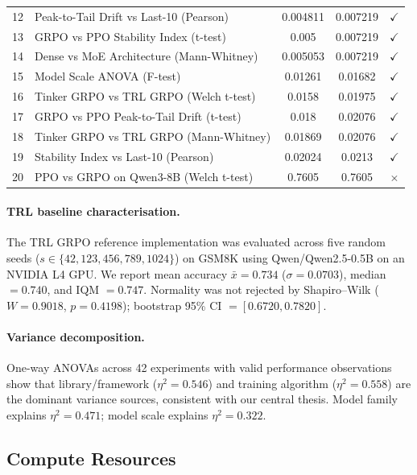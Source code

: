 \documentclass{article}
\begin{document}
\begin{table}[!ht]
\begin{tabular}{@{}rp{6.2cm}ccc@{}}
        12 & Peak-to-Tail Drift vs Last-10 (Pearson) & 0.004811 & 0.007219 & $\checkmark$ \\
        13 & GRPO vs PPO Stability Index (t-test) & 0.005 & 0.007219 & $\checkmark$ \\
        14 & Dense vs MoE Architecture (Mann-Whitney) & 0.005053 & 0.007219 & $\checkmark$ \\
        15 & Model Scale ANOVA (F-test) & 0.01261 & 0.01682 & $\checkmark$ \\
        16 & Tinker GRPO vs TRL GRPO (Welch t-test) & 0.0158 & 0.01975 & $\checkmark$ \\
        17 & GRPO vs PPO Peak-to-Tail Drift (t-test) & 0.018 & 0.02076 & $\checkmark$ \\
        18 & Tinker GRPO vs TRL GRPO (Mann-Whitney) & 0.01869 & 0.02076 & $\checkmark$ \\
        19 & Stability Index vs Last-10 (Pearson) & 0.02024 & 0.0213 & $\checkmark$ \\
        20 & PPO vs GRPO on Qwen3-8B (Welch t-test) & 0.7605 & 0.7605 & $\times$ \\
\bottomrule
\end{tabular}
\end{table}

\paragraph{TRL baseline characterisation.}
The TRL GRPO reference implementation was evaluated across five random seeds
($s \in \{42, 123, 456, 789, 1024\}$) on GSM8K using Qwen/Qwen2.5-0.5B on
an NVIDIA L4 GPU. We report mean accuracy $\bar{x} = 0.734$ ($\sigma = 0.0703$),
median $= 0.740$, and IQM $= 0.747$. Normality was not rejected by Shapiro--Wilk
($W = 0.9018$, $p = 0.4198$); bootstrap 95\% CI $= [0.6720, 0.7820]$.

\paragraph{Variance decomposition.}
One-way ANOVAs across 42 experiments with valid performance observations show
that library/framework ($\eta^2 = 0.546$) and training algorithm ($\eta^2 = 0.558$)
are the dominant variance sources, consistent with our central thesis. Model
family explains $\eta^2 = 0.471$; model scale explains $\eta^2 = 0.322$.

\subsection{Compute Resources}
\end{document}
